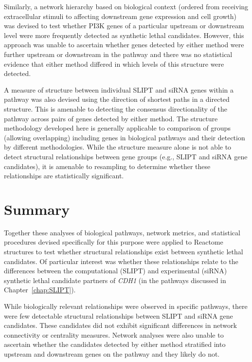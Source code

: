 Similarly, a network hierarchy based on biological context (ordered from receiving extracellular stimuli to affecting downstream \gls{gene expression} and cell growth) was devised to test whether \gls{PI3K} genes of a particular upstream or downstream level were more frequently detected as \gls{synthetic lethal} candidates. However, this approach was unable to ascertain whether genes detected by either method were further upstream or downstream in the \gls{pathway} and there was no statistical evidence that either method differed in which levels of this structure were detected.

A measure of  structure between individual \gls{SLIPT} and \gls{siRNA} genes within a \gls{pathway} was also devised using the direction of \glspl{shortest path} in a directed  structure. This is amenable to detecting the consensus directionality of the \gls{pathway} across pairs of genes detected by either method. The  structure methodology developed here is generally applicable to comparison of  groups (allowing overlapping) including genes in biological \glspl{pathway} and their detection by different methodologies. While the  structure measure alone is not able to detect structural relationships between gene groups (e.g., \gls{SLIPT} and \gls{siRNA} gene candidates), it is amenable to resampling to determine whether these relationships are statistically significant.

\section{Summary}

Together these analyses of biological \glspl{pathway}, network metrics, and statistical procedures devised specifically for this purpose were applied to Reactome  structures to test whether structural relationships exist between \gls{synthetic lethal} candidates. Of particular interest was whether these relationships relate to the differences between the computational (\gls{SLIPT}) and experimental (\gls{siRNA}) \gls{synthetic lethal} candidate partners of \textit{CDH1} (in the \glspl{pathway} discussed in Chapter~\ref{chap:SLIPT}).

While biologically relevant relationships were observed in specific \glspl{pathway}, there were few detectable structural relationships between \gls{SLIPT} and \gls{siRNA} gene candidates. These candidates did not exhibit significant differences in network connectivity or \gls{centrality} measures. Network analyses were also unable to ascertain whether the candidates detected by either method stratified into upstream and downstream genes on the \gls{pathway} and they likely do not.

